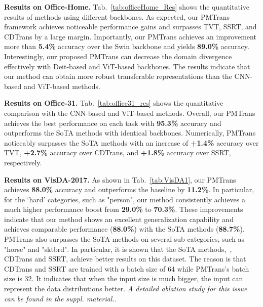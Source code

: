\documentclass[10pt,twocolumn,letterpaper, ]{article}
\begin{document}
\noindent\textbf{Results on Office-Home.} Tab.~\ref{tab:officeHome_Res} shows the quantitative results of methods using different backbones. As expected, our PMTrans framework achieves noticeable performance gains and surpasses TVT, SSRT, and CDTrans by a large margin. Importantly, our PMTrans achieves an improvement more than \textbf{5.4\%} accuracy over the Swin backbone and yields \textbf{89.0\%} accuracy. Interestingly, our proposed PMTrans can decrease the domain divergence effectively with Deit-based and ViT-based backbones. The results indicate that our method can obtain more robust transferable representations than the CNN-based and ViT-based methods.

\noindent\textbf{Results on Office-31.}  Tab.~\ref{tab:office31_res} shows the quantitative comparison with the CNN-based and ViT-based methods.
Overall, our PMTrans achieves the best performance on each task with \textbf{95.3\%} accuracy and outperforms the SoTA methods with identical backbones. Numerically, PMTrans noticeably surpasses the SoTA methods with an increase of \textbf{+1.4\%} accuracy over TVT, \textbf{+2.7\%} accuracy over CDTrans, and \textbf{+1.8\%} accuracy over SSRT, respectively. 

\noindent\textbf{Results on VisDA-2017.} 
As shown in Tab.~\ref{tab:VisDA1}, our PMTrans achieves \textbf{88.0\%} accuracy and outperforms the baseline by \textbf{11.2\%}. In particular, for the `hard' categories, such as "person", our method consistently achieves a much higher performance boost from \textbf{29.0\%} to \textbf{70.3\%}. These improvements indicate that our method shows an excellent generalization capability and achieves comparable performance (\textbf{88.0\%}) with the SoTA methods (\textbf{88.7\%}). PMTrans also surpasses the SoTA methods on several sub-categories, such as "horse" and "sktbrd". 
In particular, it is shown that the SoTA methods,~\eg, CDTrans and SSRT, achieve better results on this dataset. The reason is that CDTrans and SSRT are trained with a batch size of 64 while PMTrans's batch size is 32. It indicates that when the input size is much bigger, the input can represent the data distributions better. \textit{A detailed ablation study for this issue can be found in the suppl. material.}. 
\end{document}
